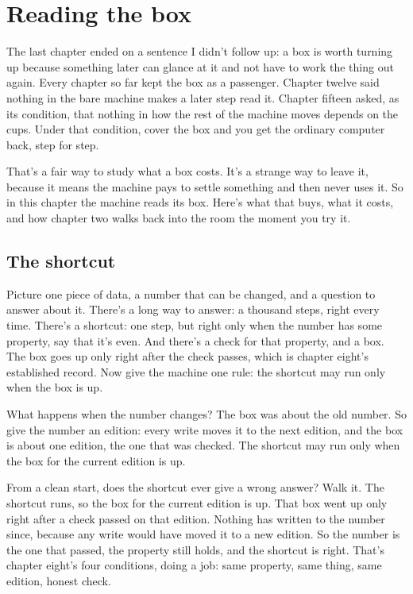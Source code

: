 \documentclass[11pt,twoside]{article}
\theoremstyle{thielethm}
\theoremstyle{thieledef}
\theoremstyle{thieledef}
\theoremstyle{thieledef}
\theoremstyle{thielethm}
\theoremstyle{thieleobs}
\theoremstyle{thielethm}
\begin{document}
\section{Reading the box}
\label{sec:reading-box}

The last chapter ended on a sentence I didn't follow up: a box is worth turning up because something later can glance at it and not have to work the thing out again. Every chapter so far kept the box as a passenger. Chapter twelve said nothing in the bare machine makes a later step read it. Chapter fifteen asked, as its condition, that nothing in how the rest of the machine moves depends on the cups. Under that condition, cover the box and you get the ordinary computer back, step for step.

That's a fair way to study what a box costs. It's a strange way to leave it, because it means the machine pays to settle something and then never uses it. So in this chapter the machine reads its box. Here's what that buys, what it costs, and how chapter two walks back into the room the moment you try it.

\subsection{The shortcut}

Picture one piece of data, a number that can be changed, and a question to answer about it. There's a long way to answer: a thousand steps, right every time. There's a shortcut: one step, but right only when the number has some property, say that it's even. And there's a check for that property, and a box. The box goes up only right after the check passes, which is chapter eight's established record. Now give the machine one rule: the shortcut may run only when the box is up.

What happens when the number changes? The box was about the old number. So give the number an edition: every write moves it to the next edition, and the box is about one edition, the one that was checked. The shortcut may run only when the box for the current edition is up.

From a clean start, does the shortcut ever give a wrong answer? Walk it. The shortcut runs, so the box for the current edition is up. That box went up only right after a check passed on that edition. Nothing has written to the number since, because any write would have moved it to a new edition. So the number is the one that passed, the property still holds, and the shortcut is right. That's chapter eight's four conditions, doing a job: same property, same thing, same edition, honest check.
\end{document}
